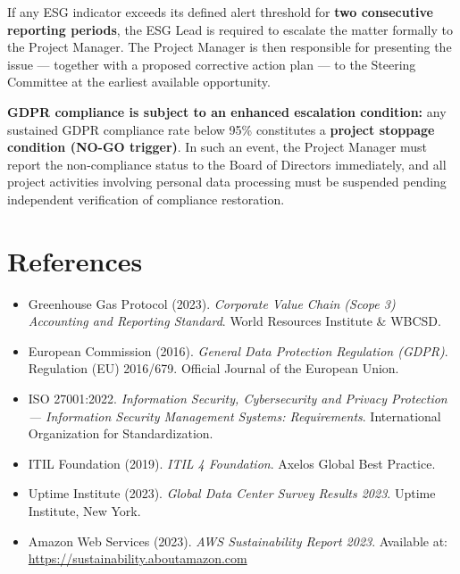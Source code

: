 If any ESG indicator exceeds its defined alert threshold for
\textbf{two consecutive reporting periods}, the ESG Lead is required to
escalate the matter formally to the Project Manager. The Project Manager
is then responsible for presenting the issue --- together with a proposed
corrective action plan --- to the Steering Committee at the earliest
available opportunity.

\textbf{GDPR compliance is subject to an enhanced escalation condition:}
any sustained GDPR compliance rate below 95\% constitutes a
\textbf{project stoppage condition (NO-GO trigger)}. In such an event,
the Project Manager must report the non-compliance status to the Board of
Directors immediately, and all project activities involving personal data
processing must be suspended pending independent verification of
compliance restoration.

\newpage

\chapter*{References}

\begin{itemize}[label={}, leftmargin=1.5em, itemsep=0.3em]
  \item Greenhouse Gas Protocol (2023). \textit{Corporate Value Chain
    (Scope 3) Accounting and Reporting Standard}. World Resources
    Institute \& WBCSD.
  \item European Commission (2016). \textit{General Data Protection
    Regulation (GDPR)}. Regulation (EU) 2016/679. Official Journal of
    the European Union.
  \item ISO 27001:2022. \textit{Information Security, Cybersecurity and
    Privacy Protection --- Information Security Management Systems:
    Requirements}. International Organization for Standardization.
  \item ITIL Foundation (2019). \textit{ITIL 4 Foundation}. Axelos
    Global Best Practice.
  \item Uptime Institute (2023). \textit{Global Data Center Survey Results
    2023}. Uptime Institute, New York.
  \item Amazon Web Services (2023). \textit{AWS Sustainability Report
    2023}. Available at: \url{https://sustainability.aboutamazon.com}
\end{itemize}

